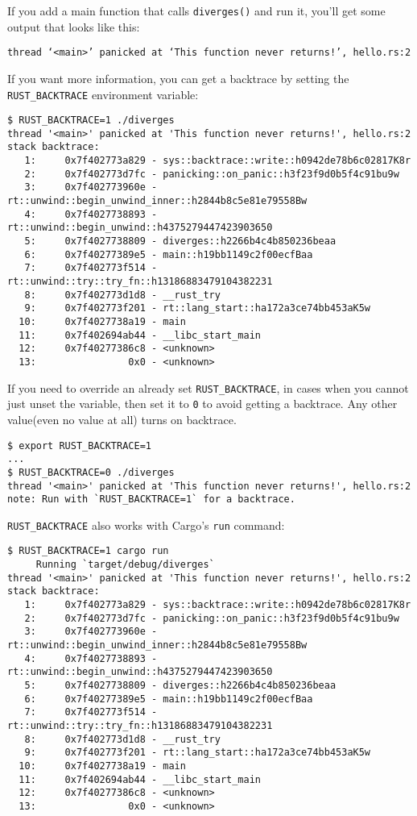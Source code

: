 \documentclass[a4paper,]{book}
\begin{document}
If you add a main function that calls \texttt{diverges()} and run it,
you'll get some output that looks like this:

\begin{verbatim}
thread ‘<main>’ panicked at ‘This function never returns!’, hello.rs:2
\end{verbatim}

If you want more information, you can get a backtrace by setting the
\texttt{RUST\_BACKTRACE} environment variable:

\begin{verbatim}
$ RUST_BACKTRACE=1 ./diverges
thread '<main>' panicked at 'This function never returns!', hello.rs:2
stack backtrace:
   1:     0x7f402773a829 - sys::backtrace::write::h0942de78b6c02817K8r
   2:     0x7f402773d7fc - panicking::on_panic::h3f23f9d0b5f4c91bu9w
   3:     0x7f402773960e - rt::unwind::begin_unwind_inner::h2844b8c5e81e79558Bw
   4:     0x7f4027738893 - rt::unwind::begin_unwind::h4375279447423903650
   5:     0x7f4027738809 - diverges::h2266b4c4b850236beaa
   6:     0x7f40277389e5 - main::h19bb1149c2f00ecfBaa
   7:     0x7f402773f514 - rt::unwind::try::try_fn::h13186883479104382231
   8:     0x7f402773d1d8 - __rust_try
   9:     0x7f402773f201 - rt::lang_start::ha172a3ce74bb453aK5w
  10:     0x7f4027738a19 - main
  11:     0x7f402694ab44 - __libc_start_main
  12:     0x7f40277386c8 - <unknown>
  13:                0x0 - <unknown>
\end{verbatim}

If you need to override an already set \texttt{RUST\_BACKTRACE}, in
cases when you cannot just unset the variable, then set it to \texttt{0}
to avoid getting a backtrace. Any other value(even no value at all)
turns on backtrace.

\begin{verbatim}
$ export RUST_BACKTRACE=1
...
$ RUST_BACKTRACE=0 ./diverges 
thread '<main>' panicked at 'This function never returns!', hello.rs:2
note: Run with `RUST_BACKTRACE=1` for a backtrace.
\end{verbatim}

\texttt{RUST\_BACKTRACE} also works with Cargo's \texttt{run} command:

\begin{verbatim}
$ RUST_BACKTRACE=1 cargo run
     Running `target/debug/diverges`
thread '<main>' panicked at 'This function never returns!', hello.rs:2
stack backtrace:
   1:     0x7f402773a829 - sys::backtrace::write::h0942de78b6c02817K8r
   2:     0x7f402773d7fc - panicking::on_panic::h3f23f9d0b5f4c91bu9w
   3:     0x7f402773960e - rt::unwind::begin_unwind_inner::h2844b8c5e81e79558Bw
   4:     0x7f4027738893 - rt::unwind::begin_unwind::h4375279447423903650
   5:     0x7f4027738809 - diverges::h2266b4c4b850236beaa
   6:     0x7f40277389e5 - main::h19bb1149c2f00ecfBaa
   7:     0x7f402773f514 - rt::unwind::try::try_fn::h13186883479104382231
   8:     0x7f402773d1d8 - __rust_try
   9:     0x7f402773f201 - rt::lang_start::ha172a3ce74bb453aK5w
  10:     0x7f4027738a19 - main
  11:     0x7f402694ab44 - __libc_start_main
  12:     0x7f40277386c8 - <unknown>
  13:                0x0 - <unknown>
\end{verbatim}
\end{document}
